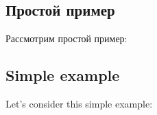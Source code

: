 \ifdefined\RUSSIAN
\subsection{Простой пример}

Рассмотрим простой пример:
\fi

\ifdefined\ENGLISH
\subsection{Simple example}

Let's consider this simple example:
\fi





\EN{}
\RU{}

